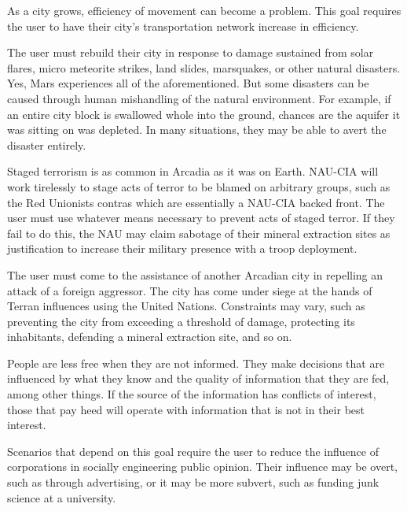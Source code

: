 
As a city grows, efficiency of movement can become a problem. This goal requires the user to have their city's transportation network increase in efficiency.


The user must rebuild their city in response to damage sustained from solar flares, micro meteorite strikes, land slides, marsquakes, or other natural disasters. Yes, Mars experiences all of the aforementioned. But some  disasters can be caused through human mishandling of the natural environment. For example, if an entire city block is swallowed whole into the ground, chances are the aquifer it was sitting on was depleted. In many situations, they may be able to avert the disaster entirely.


Staged terrorism is as common in Arcadia as it was on Earth. NAU-CIA will work tirelessly to stage acts of terror to be blamed on arbitrary groups, such as the Red Unionists contras which are essentially a NAU-CIA backed front. The user must use whatever means necessary to prevent acts of staged terror. If they fail to do this, the NAU may claim sabotage of their mineral extraction sites as justification to increase their military presence with a troop deployment.


The user must come to the assistance of another Arcadian city in repelling an attack of a foreign aggressor. The city has come under siege at the hands of Terran influences using the United Nations. Constraints may vary, such as preventing the city from exceeding a threshold of damage, protecting its inhabitants, defending a mineral extraction site, and so on.


People are less free when they are not informed. They make decisions that are influenced by what they know and the quality of information that they are fed, among other things. If the source of the information has conflicts of interest, those that pay heed will operate with information that is not in their best interest. 

Scenarios that depend on this goal require the user to reduce the influence of corporations in socially engineering public opinion. Their influence may be overt, such as through advertising, or it may be more subvert, such as funding junk science at a university. 


